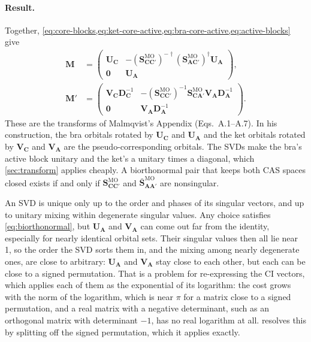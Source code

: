 \documentclass[aip,jcp,preprint]{revtex4-1}
\newcommand{\bvec}[1]{\mathbf{#1}}
\newcommand{\SMO}{\bvec{S}^{\mathrm{MO}}}
\begin{document}
\paragraph{Result.}
Together, \cref{eq:core-blocks,eq:ket-core-active,eq:bra-core-active,eq:active-blocks} give
\begin{align}
 \bvec{M} &=
 \begin{pmatrix}
  \bvec{U}_{\bvec{C}} &
  -(\SMO_{\bvec{C}\bvec{C}'})^{-\dagger}(\SMO_{\bvec{A}\bvec{C}'})^\dagger
  \bvec{U}_{\bvec{A}} \\
  \bvec{0} & \bvec{U}_{\bvec{A}}
 \end{pmatrix},
 \label{eq:transform-bra}\\
 \bvec{M}' &=
 \begin{pmatrix}
  \bvec{V}_{\bvec{C}}\bvec{D}_{\bvec{C}}^{-1} &
  -(\SMO_{\bvec{C}\bvec{C}'})^{-1}\SMO_{\bvec{C}\bvec{A}'}
  \bvec{V}_{\bvec{A}}\bvec{D}_{\bvec{A}}^{-1} \\
  \bvec{0} & \bvec{V}_{\bvec{A}}\bvec{D}_{\bvec{A}}^{-1}
 \end{pmatrix}.
 \label{eq:transform-ket}
\end{align}
These are the transforms of Malmqvist's Appendix (Eqs.~A.1--A.7).\cite{Malmqvist1986}
In his construction, the bra orbitals rotated by $\bvec{U}_{\bvec{C}}$ and $\bvec{U}_{\bvec{A}}$ and the ket orbitals rotated by $\bvec{V}_{\bvec{C}}$ and $\bvec{V}_{\bvec{A}}$ are the pseudo-corresponding orbitals.
The SVDs make the bra's active block unitary and the ket's a unitary times a diagonal, which \cref{sec:transform} applies cheaply.
A biorthonormal pair that keeps both CAS spaces closed exists if and only if $\SMO_{\bvec{C}\bvec{C}'}$ and $\bar{\bvec{S}}^{\mathrm{MO}}_{\bvec{A}\bvec{A}'}$ are nonsingular.

An SVD is unique only up to the order and phases of its singular vectors, and up to unitary mixing within degenerate singular values.
Any choice satisfies \cref{eq:biorthonormal}, but $\bvec{U}_{\bvec{A}}$ and $\bvec{V}_{\bvec{A}}$ can come out far from the identity, especially for nearly identical orbital sets.
Their singular values then all lie near 1, so the order the SVD sorts them in, and the mixing among nearly degenerate ones, are close to arbitrary: $\bvec{U}_{\bvec{A}}$ and $\bvec{V}_{\bvec{A}}$ stay close to each other, but each can be close to a signed permutation.
That is a problem for re-expressing the CI vectors, which applies each of them as the exponential of its logarithm: the cost grows with the norm of the logarithm, which is near $\pi$ for a matrix close to a signed permutation, and a real matrix with a negative determinant, such as an orthogonal matrix with determinant $-1$, has no real logarithm at all.
 resolves this by splitting off the signed permutation, which it applies exactly.
\end{document}

